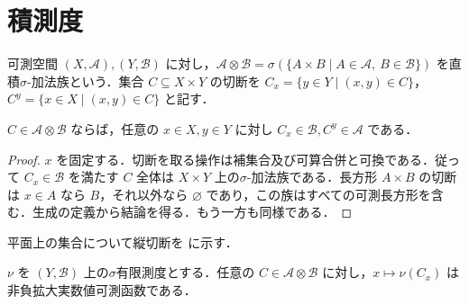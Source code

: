 \section{積測度}
\begin{defn}
可測空間 $(X,\mathcal A),(Y,\mathcal B)$ に対し，$\mathcal A\otimes\mathcal B=\sigma(\{A\times B\mid A\in\mathcal A,\ B\in\mathcal B\})$ を直積$\sigma$-加法族という．集合 $C\subseteq X\times Y$ の切断を $C_x=\{y\in Y\mid (x,y)\in C\}$，$C^y=\{x\in X\mid (x,y)\in C\}$ と記す．
\end{defn}
\begin{prop}[可測集合の切断]
$C\in\mathcal A\otimes\mathcal B$ ならば，任意の $x\in X,y\in Y$ に対し $C_x\in\mathcal B,C^y\in\mathcal A$ である．
\end{prop}
\begin{proof}
$x$ を固定する．切断を取る操作は補集合及び可算合併と可換である．従って $C_x\in\mathcal B$ を満たす $C$ 全体は $X\times Y$ 上の$\sigma$-加法族である．長方形 $A\times B$ の切断は $x\in A$ なら $B$，それ以外なら $\varnothing$ であり，この族はすべての可測長方形を含む．生成の定義から結論を得る．もう一方も同様である．
\end{proof}
平面上の集合について縦切断を  に示す．
\begin{prop}[切断の測度の可測性]
$\nu$ を $(Y,\mathcal B)$ 上の$\sigma$有限測度とする．任意の $C\in\mathcal A\otimes\mathcal B$ に対し，$x\mapsto \nu(C_x)$ は非負拡大実数値可測函数である．
\end{prop}
